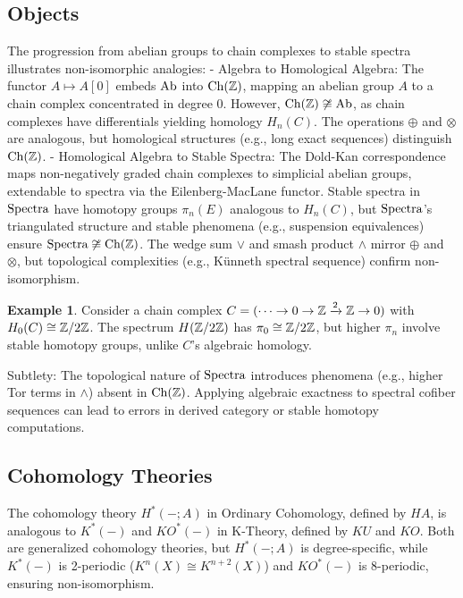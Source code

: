 \documentclass{article}
\theoremstyle{plain}
\theoremstyle{definition}
\newtheorem{example}{Example}
\begin{document}
\subsection{Objects}
The progression from abelian groups to chain complexes to stable spectra illustrates non-isomorphic analogies:
- Algebra to Homological Algebra: The functor \(A \mapsto A[0]\) embeds \(\text{Ab}\) into \(\text{Ch}(\mathbb{Z})\), mapping an abelian group \(A\) to a chain complex concentrated in degree 0. However, \(\text{Ch}(\mathbb{Z}) \not\cong \text{Ab}\), as chain complexes have differentials yielding homology \(H_n(C)\). The operations \(\oplus\) and \(\otimes\) are analogous, but homological structures (e.g., long exact sequences) distinguish \(\text{Ch}(\mathbb{Z})\).
- Homological Algebra to Stable Spectra: The Dold-Kan correspondence maps non-negatively graded chain complexes to simplicial abelian groups, extendable to spectra via the Eilenberg-MacLane functor. Stable spectra in \(\text{Spectra}\) have homotopy groups \(\pi_n(E)\) analogous to \(H_n(C)\), but \(\text{Spectra}\)’s triangulated structure and stable phenomena (e.g., suspension equivalences) ensure \(\text{Spectra} \not\cong \text{Ch}(\mathbb{Z})\). The wedge sum \(\vee\) and smash product \(\wedge\) mirror \(\oplus\) and \(\otimes\), but topological complexities (e.g., Künneth spectral sequence) confirm non-isomorphism.

\begin{example}
Consider a chain complex \(C = (\dots \to 0 \to \mathbb{Z} \xrightarrow{2} \mathbb{Z} \to 0)\) with \(H_0(C) \cong \mathbb{Z}/2\mathbb{Z}\). The spectrum \(H(\mathbb{Z}/2\mathbb{Z})\) has \(\pi_0 \cong \mathbb{Z}/2\mathbb{Z}\), but higher \(\pi_n\) involve stable homotopy groups, unlike \(C\)’s algebraic homology.
\end{example}

Subtlety: The topological nature of \(\text{Spectra}\) introduces phenomena (e.g., higher Tor terms in \(\wedge\)) absent in \(\text{Ch}(\mathbb{Z})\). Applying algebraic exactness to spectral cofiber sequences can lead to errors in derived category or stable homotopy computations.

\subsection{Cohomology Theories}
The cohomology theory \(H^*(-; A)\) in Ordinary Cohomology,
defined by \(HA\), is analogous to \(K^*(-)\) and \(KO^*(-)\) in K-Theory,
defined by \(KU\) and \(KO\). Both are generalized cohomology theories,
but \(H^*(-; A)\) is degree-specific, while \(K^*(-)\) is 2-periodic
(\(K^n(X) \cong K^{n+2}(X)\)) and \(KO^*(-)\) is 8-periodic, ensuring non-isomorphism.
\end{document}
